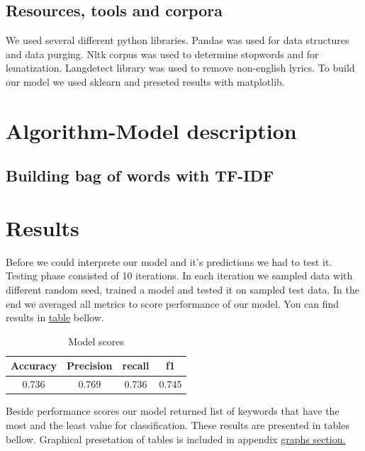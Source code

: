 \documentclass[a4paper,11pt]{article}
\begin{document}
\subsection{Resources, tools and corpora}

We used several different python libraries. Pandas was used for data structures and data purging. Nltk corpus was used to determine stopwords and for lematization. Langdetect library was used to remove non-english lyrics. To build our model we used sklearn and preseted results with matplotlib.

\section{Algorithm-Model description}


\subsection{Building bag of words with TF-IDF}



\pagebreak
\section{Results}

Before we could interprete our model and it's predictions we had to test it. Testing phase consisted of 10 iterations. In each iteration we sampled data with different random seed, trained a model and tested it on sampled test data. In the end we averaged all metrics to score performance of our model. You can find results in \hyperref[label-model-score]{table} bellow.

\begin{table}[h!]
\centering
\label{baseline}
\begin{tabular}{cccc}
\hline
Accuracy & Precision & recall & f1 \\
\hline
0.736 & 0.769 & 0.736 & 0.745 \\
\end{tabular}
\label{label-model-score}
\caption{Model scores}
\end{table}

\noindent Beside performance scores our model returned list of keywords that have the most and the least value for classification. These results are presented in tables bellow. Graphical presetation of tables is included in appendix \hyperref[label-graphs]{graphs section.}
\end{document}
